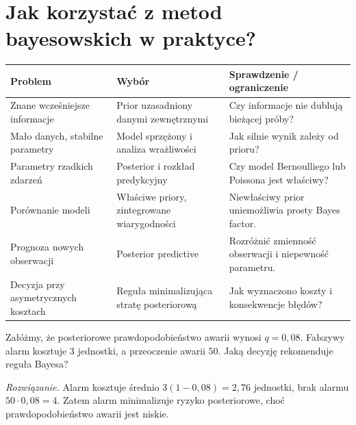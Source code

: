 \section{Jak korzystać z metod bayesowskich w praktyce?}
\begin{center}\small
\begin{tabular}{>{\raggedright\arraybackslash}p{}>{\raggedright\arraybackslash}p{}>{\raggedright\arraybackslash}p{}}
\toprule
\textbf{Problem} & \textbf{Wybór} & \textbf{Sprawdzenie / ograniczenie}\\
\midrule
Znane wcześniejsze informacje & Prior uzasadniony danymi zewnętrznymi & Czy informacje nie dublują bieżącej próby?\\
Mało danych, stabilne parametry & Model sprzężony i analiza wrażliwości & Jak silnie wynik zależy od prioru?\\
Parametry rzadkich zdarzeń & Posterior i rozkład predykcyjny & Czy model Bernoulliego lub Poissona jest właściwy?\\
Porównanie modeli & Właściwe priory, zintegrowane wiarygodności & Niewłaściwy prior uniemożliwia prosty Bayes factor.\\
Prognoza nowych obserwacji & Posterior predictive & Rozróżnić zmienność obserwacji i niepewność parametru.\\
Decyzja przy asymetrycznych kosztach & Reguła minimalizująca stratę posteriorową & Jak wyznaczono koszty i konsekwencje błędów?\\
\bottomrule
\end{tabular}
\end{center}

\begin{zadanie}
Załóżmy, że posteriorowe prawdopodobieństwo awarii wynosi $q=0{,}08$.
Fałszywy alarm kosztuje $3$ jednostki, a przeoczenie awarii $50$.
Jaką decyzję rekomenduje reguła Bayesa?
\par\emph{Rozwiązanie.} Alarm kosztuje średnio
$3(1-0{,}08)=2{,}76$ jednostki, brak alarmu
$50\cdot0{,}08=4$. Zatem alarm minimalizuje ryzyko
posteriorowe, choć prawdopodobieństwo awarii jest niskie.
\end{zadanie}

